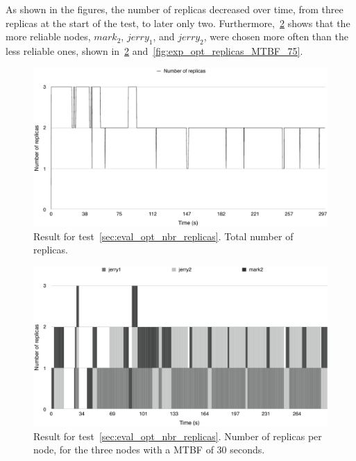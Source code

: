 \documentclass{cslthse-msc}
\begin{document}
As shown in the figures, the number of replicas decreased over time, from three replicas at the start of the test, to later only two. Furthermore,~\cref{fig:exp_opt_replicas_MTBF_30} shows that the more reliable nodes, $mark_2$, $jerry_1$, and $jerry_2$, were chosen more often than the less reliable ones, shown in~\cref{fig:exp_opt_replicas_MTBF_30} and~\cref{fig:exp_opt_replicas_MTBF_75}.

\begin{figure}[!hbt]
\centering
\includegraphics[scale=0.5]{images/results/optimal_replicas/total.pdf}
\caption{Result for test~\ref{sec:eval_opt_nbr_replicas}. Total number of replicas.} \label{fig:exp_opt_replicas_total}
\end{figure}

\begin{figure}[!hbt]
\centering
\includegraphics[scale=0.5]{images/results/optimal_replicas/MTBF_30.pdf}
\caption{Result for test~\ref{sec:eval_opt_nbr_replicas}. Number of replicas per node, for the three nodes with a MTBF of 30 seconds.} \label{fig:exp_opt_replicas_MTBF_30}
\end{figure}
\end{document}
